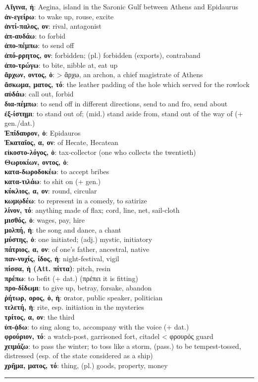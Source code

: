 \documentclass[13pt]{article}
\newcommand{\vocabentry}[2]{\textbf{#1}: #2\vspace{0.0em}\\}
\begin{document}
\begin{greek}
\newpage
\begin{multicols}{2}
\small %
\vocabentry{Αἴγινα, ἡ}{Aegina, island in the Saronic Gulf between Athens and Epidaurus}
\vocabentry{ἀν-εγείρω}{to wake up, rouse, excite}
\vocabentry{ἀντί-παλος, ον}{rival, antagonist}
\vocabentry{ἀπ-αυδάω}{to forbid}
\vocabentry{ἀπο-πέμπω}{to send off}
\vocabentry{ἀπό-ρρητος, ον}{forbidden; (pl.) forbidden (exports), contraband}
\vocabentry{ἀπο-τρώγω}{to bite, nibble at, eat up}
\vocabentry{ἄρχων, οντος, ὁ}{> ἄρχω, an archon, a chief magistrate of Athens}
\vocabentry{ἄσκωμα, ματος, τό}{the leather padding of the hole which served for the rowlock}
\vocabentry{αὐδάω}{call out, forbid}
\vocabentry{δια-πέμπω}{to send off in different directions, send to and fro, send about}
\vocabentry{ἐξ-ίστημι}{to stand out of; (mid.) stand aside from, stand out of the way of (+ gen./dat.)}
\vocabentry{Ἐπίδαυρον, ὁ}{Epidauros}
\vocabentry{Ἑκαταῖος, α, ον}{of Hecate, Hecatean}
\vocabentry{εἰκοστο-λόγος, ὁ}{tax-collector (one who collects the twentieth)}
\vocabentry{Θωρυκίων, οντος, ὁ}{}
\vocabentry{κατα-δωροδοκέω}{to accept bribes}
\vocabentry{κατα-τιλάω}{to shit on (+ gen.)}
\vocabentry{κύκλιος, α, ον}{round, circular}
\vocabentry{κωμῳδέω}{to represent in a comedy, to satirize}
\vocabentry{λίνον, τό}{anything made of flax; cord, line, net, sail-cloth}
\vocabentry{μισθός, ὁ}{wages, pay, hire}
\vocabentry{μολπή, ἡ}{the song and dance, a chant}
\vocabentry{μύστης, ὁ}{one initiated; (adj.) mystic, initiatory}
\vocabentry{πάτριος, α, ον}{of one’s father, ancestral, native}
\vocabentry{παν-νυχίς, ίδος, ἡ}{night-festival, vigil}
\vocabentry{πίσσα, ἡ (Att. πίττα)}{pitch, resin}
\vocabentry{πρέπω}{to befit (+ dat.) (πρέπει it is fitting)}
\vocabentry{προ-δίδωμι}{to give up, betray, forsake, abandon}
\vocabentry{ῥήτωρ, ορος, ὁ, ἡ}{οrator, public speaker, politician}
\vocabentry{τελετή, ἡ}{rite, esp. initiation in the mysteries}
\vocabentry{τρίτος, α, ον}{the third}
\vocabentry{ὑπ-ᾴδω}{to sing along to, accompany with the voice (+ dat.)}
\vocabentry{φρούριον, τό}{a watch-post, garrisoned fort, citadel < φρουρός guard}
\vocabentry{χειμάζω}{to pass the winter; to toss like a storm, (pass.) to be tempest-tossed, distressed (esp. of the state considered as a ship)}
\vocabentry{χρῆμα, ματος, τό}{thing, (pl.) goods, property, money}
\end{multicols}

\vspace{-1.5em}
\noindent\rule{\linewidth}{0.4pt}
\vspace{-2em}


\end{greek}
\end{document}
